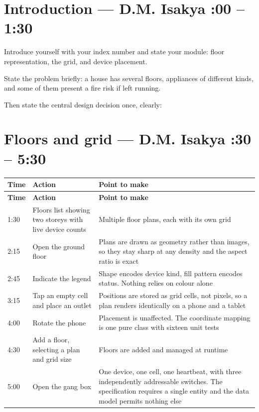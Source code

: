 \documentclass[11pt,a4paper]{article}
\makeatletter
\newenvironment{runsheet}
  {\begin{longtable}{@{}L{1.5cm}L{5.4cm}L{7.9cm}@{}}
   \toprule \textbf{Time} & \textbf{Action} & \textbf{Point to make} \\ \midrule
   \endfirsthead
   \toprule \textbf{Time} & \textbf{Action} & \textbf{Point to make} \\ \midrule
   \endhead}
  {\bottomrule\end{longtable}}
\makeatother
\begin{document}
\newpage
\section{Introduction --- D.M. Isakya \hfill {}:00 -- 1:30}

Introduce yourself with your index number and state your module: floor
representation, the grid, and device placement.

State the problem briefly: a house has several floors, appliances of different
kinds, and some of them present a fire risk if left running.

Then state the central design decision once, clearly:


\section{Floors and grid --- D.M. Isakya \hfill {}:30 -- 5:30}

\begin{runsheet}
1:30 & Floors list showing two storeys with live device counts & Multiple floor plans, each with its own grid \\
2:15 & Open the ground floor & Plans are drawn as geometry rather than images, so they stay sharp at any density and the aspect ratio is exact \\
2:45 & Indicate the legend & Shape encodes device kind, fill pattern encodes status. Nothing relies on colour alone \\
3:15 & Tap an empty cell and place an outlet & Positions are stored as grid cells, not pixels, so a plan renders identically on a phone and a tablet \\
4:00 & Rotate the phone & Placement is unaffected. The coordinate mapping is one pure class with sixteen unit tests \\
4:30 & Add a floor, selecting a plan and grid size & Floors are added and managed at runtime \\
5:00 & Open the gang box & One device, one cell, one heartbeat, with three independently addressable switches. The specification requires a single entity and the data model permits nothing else \\
\end{runsheet}
\end{document}
